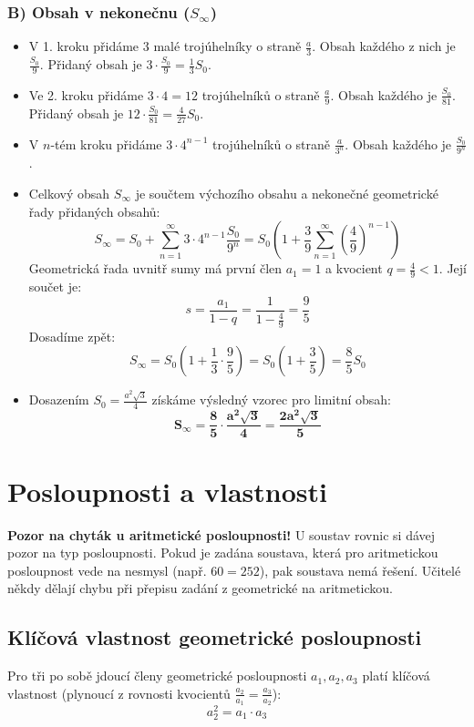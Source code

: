 \documentclass[12pt,a4paper]{article}
\begin{document}
\subsubsection*{B) Obsah v nekonečnu ($S_\infty$)}
\begin{itemize}
    \item V 1. kroku přidáme $3$ malé trojúhelníky o straně $\frac{a}{3}$. Obsah každého z nich je $\frac{S_0}{9}$. Přidaný obsah je $3 \cdot \frac{S_0}{9} = \frac{1}{3} S_0$.
    \item Ve 2. kroku přidáme $3 \cdot 4 = 12$ trojúhelníků o straně $\frac{a}{9}$. Obsah každého je $\frac{S_0}{81}$. Přidaný obsah je $12 \cdot \frac{S_0}{81} = \frac{4}{27} S_0$.
    \item V $n$-tém kroku přidáme $3 \cdot 4^{n-1}$ trojúhelníků o straně $\frac{a}{3^n}$. Obsah každého je $\frac{S_0}{9^n}$.
    \item Celkový obsah $S_\infty$ je součtem výchozího obsahu a nekonečné geometrické řady přidaných obsahů:
    \[ S_\infty = S_0 + \sum_{n=1}^{\infty} 3 \cdot 4^{n-1} \frac{S_0}{9^n} = S_0 \left(1 + \frac{3}{9} \sum_{n=1}^{\infty} \left(\frac{4}{9}\right)^{n-1}\right) \]
    Geometrická řada uvnitř sumy má první člen $a_1 = 1$ a kvocient $q = \frac{4}{9} < 1$. Její součet je:
    \[ s = \frac{a_1}{1-q} = \frac{1}{1 - \frac{4}{9}} = \frac{9}{5} \]
    Dosadíme zpět:
    \[ S_\infty = S_0 \left(1 + \frac{1}{3} \cdot \frac{9}{5}\right) = S_0 \left(1 + \frac{3}{5}\right) = \frac{8}{5} S_0 \]
    \item Dosazením $S_0 = \frac{a^2\sqrt{3}}{4}$ získáme výsledný vzorec pro limitní obsah:
    \[ \mathbf{S_\infty = \frac{8}{5} \cdot \frac{a^2\sqrt{3}}{4} = \frac{2a^2\sqrt{3}}{5}} \]
\end{itemize}

\section{Posloupnosti a vlastnosti}

\begin{tcolorbox}[colback=red!5!white,colframe=red!75!black,title=Varování]
\textbf{Pozor na chyták u aritmetické posloupnosti!} U soustav rovnic si dávej pozor na typ posloupnosti. Pokud je zadána soustava, která pro aritmetickou posloupnost vede na nesmysl (např. $60 = 252$), pak soustava nemá řešení. Učitelé někdy dělají chybu při přepisu zadání z geometrické na aritmetickou.
\end{tcolorbox}

\subsection{Klíčová vlastnost geometrické posloupnosti}
Pro tři po sobě jdoucí členy geometrické posloupnosti $a_1, a_2, a_3$ platí klíčová vlastnost (plynoucí z rovnosti kvocientů $\frac{a_2}{a_1} = \frac{a_3}{a_2}$):
\[ a_2^2 = a_1 \cdot a_3 \]
\end{document}
